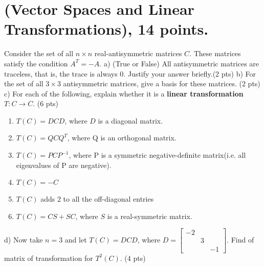 \documentclass{article}
\begin{document}
\section{(Vector Spaces and Linear Transformations), 14 points.}
\newline Consider the set of all \( n \times n\) real-antisymmetric matrices \(C\). These matrices satisfy the condition \(A^T = -A\).
\newline
\newline a) (True or False) All antisymmetric matrices are traceless, that is, the trace is always 0. Justify your answer briefly.(2 pts)
\newline
\newline b) For the set of all \( 3 \times 3\) antisymmetric matrices, give a basis for these matrices. (2 pts)
\newline
\newline c) For each of the following, explain whether it is a \textbf{linear transformation} \(T: C \rightarrow{C} \). (6 pts)
\begin{enumerate}
    \item \(T(C) = DCD\), where \(D\) is a diagonal matrix.
    \item \(T(C) = QCQ^T\), where Q is an orthogonal matrix.
    \item \(T(C) = PCP^{-1}\), where P is a symmetric negative-definite matrix(i.e. all eigenvalues of P are negative).
    \item \(T(C) = -C\)
    \item \(T(C)\) adds 2 to all the off-diagonal entries
    \item \(T(C) = CS + SC\), where \(S\) is a real-symmetric matrix.
\newline
\end{enumerate}
\newline
\newline d) Now take \( n = 3 \) and let \(T(C) = DCD\), where \(D = \begin{bmatrix}
-2 &&\\ &3& \\ &&-1\end{bmatrix} \). Find of matrix of transformation for \(T^2(C)\). (4 pts)
\newline
\end{document}
